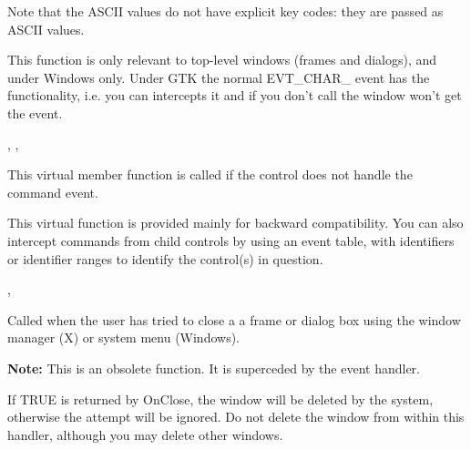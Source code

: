 Note that the ASCII values do not have explicit key codes: they are passed as ASCII
values.

This function is only relevant to top-level windows (frames and dialogs), and under
Windows only. Under GTK the normal EVT\_CHAR\_ event has the functionality, i.e.
you can intercepts it and if you don't call 
the window won't get the event.


,\rtfsp
{},\rtfsp
{}

\label{wxwindowoncommand}


This virtual member function is called if the control does not handle the command event.





This virtual function is provided mainly for backward compatibility. You can also intercept commands
from child controls by using an event table, with identifiers or identifier ranges to identify
the control(s) in question.


,\rtfsp
{}

\label{wxwindowonclose}


Called when the user has tried to close a a frame
or dialog box using the window manager (X) or system menu (Windows).

{\bf Note:} This is an obsolete function.
It is superceded by the  event
handler.


If TRUE is returned by OnClose, the window will be deleted by the system, otherwise the
attempt will be ignored. Do not delete the window from within this handler, although
you may delete other windows.

